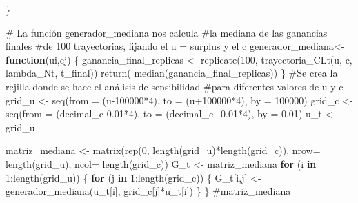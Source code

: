 \documentclass[
  us-letterpaper,
]{scrreprt}
\newenvironment{Shaded}{\begin{snugshade}}{\end{snugshade}}
\newcommand{\AttributeTok}[1]{\textcolor[rgb]{0.40,0.45,0.13}{#1}}
\newcommand{\CommentTok}[1]{\textcolor[rgb]{0.37,0.37,0.37}{#1}}
\newcommand{\ControlFlowTok}[1]{\textcolor[rgb]{0.00,0.23,0.31}{\textbf{#1}}}
\newcommand{\DecValTok}[1]{\textcolor[rgb]{0.68,0.00,0.00}{#1}}
\newcommand{\FloatTok}[1]{\textcolor[rgb]{0.68,0.00,0.00}{#1}}
\newcommand{\FunctionTok}[1]{\textcolor[rgb]{0.28,0.35,0.67}{#1}}
\newcommand{\NormalTok}[1]{\textcolor[rgb]{0.00,0.23,0.31}{#1}}
\newcommand{\OtherTok}[1]{\textcolor[rgb]{0.00,0.23,0.31}{#1}}
\newcommand{\SpecialCharTok}[1]{\textcolor[rgb]{0.37,0.37,0.37}{#1}}
\theoremstyle{plain}
\theoremstyle{plain}
\theoremstyle{definition}
\theoremstyle{remark}
\begin{document}
\begin{Shaded}
\begin{Highlighting}[]
\NormalTok{\}}

\CommentTok{\# La función generador\_mediana nos calcula }
\CommentTok{\#la mediana de las ganancias finales }
\CommentTok{\#de 100 trayectorias, fijando el u = surplus y el c}
\NormalTok{generador\_mediana}\OtherTok{\textless{}{-}} \ControlFlowTok{function}\NormalTok{(ui,cj)}
\NormalTok{  \{}
\NormalTok{  ganancia\_final\_replicas }\OtherTok{\textless{}{-}} \FunctionTok{replicate}\NormalTok{(}\DecValTok{100}\NormalTok{, }
                                       \FunctionTok{trayectoria\_CLt}\NormalTok{(u, c,}
\NormalTok{                                        lambda\_Nt, t\_final))}
  \FunctionTok{return}\NormalTok{( }\FunctionTok{median}\NormalTok{(ganancia\_final\_replicas))}
\NormalTok{  \}}
\CommentTok{\#Se crea la rejilla donde se hace el análisis de sensibilidad}
\CommentTok{\#para diferentes valores de u y c}
\NormalTok{grid\_u }\OtherTok{\textless{}{-}} \FunctionTok{seq}\NormalTok{(}\AttributeTok{from =}\NormalTok{ (u}\DecValTok{{-}100000}\SpecialCharTok{*}\DecValTok{4}\NormalTok{), }\AttributeTok{to =}\NormalTok{ (u}\SpecialCharTok{+}\DecValTok{100000}\SpecialCharTok{*}\DecValTok{4}\NormalTok{), }\AttributeTok{by =} \DecValTok{100000}\NormalTok{)}
\NormalTok{grid\_c }\OtherTok{\textless{}{-}} \FunctionTok{seq}\NormalTok{(}\AttributeTok{from =}\NormalTok{ (decimal\_c}\FloatTok{{-}0.01}\SpecialCharTok{*}\DecValTok{4}\NormalTok{), }\AttributeTok{to =}\NormalTok{ (decimal\_c}\FloatTok{+0.01}\SpecialCharTok{*}\DecValTok{4}\NormalTok{), }
              \AttributeTok{by =} \FloatTok{0.01}\NormalTok{)}
\NormalTok{u\_t }\OtherTok{\textless{}{-}}\NormalTok{ grid\_u}

\NormalTok{matriz\_mediana }\OtherTok{\textless{}{-}} \FunctionTok{matrix}\NormalTok{(}\FunctionTok{rep}\NormalTok{(}\DecValTok{0}\NormalTok{, }\FunctionTok{length}\NormalTok{(grid\_u)}\SpecialCharTok{*}\FunctionTok{length}\NormalTok{(grid\_c)),}
\AttributeTok{nrow=} \FunctionTok{length}\NormalTok{(grid\_u), }\AttributeTok{ncol=} \FunctionTok{length}\NormalTok{(grid\_c))}
\NormalTok{G\_t }\OtherTok{\textless{}{-}}\NormalTok{ matriz\_mediana}
\ControlFlowTok{for}\NormalTok{ (i }\ControlFlowTok{in} \DecValTok{1}\SpecialCharTok{:}\FunctionTok{length}\NormalTok{(grid\_u)) }
\NormalTok{  \{}
    \ControlFlowTok{for}\NormalTok{ (j }\ControlFlowTok{in} \DecValTok{1}\SpecialCharTok{:}\FunctionTok{length}\NormalTok{(grid\_c)) }
\NormalTok{      \{}
\NormalTok{        G\_t[i,j] }\OtherTok{\textless{}{-}} \FunctionTok{generador\_mediana}\NormalTok{(u\_t[i],}
\NormalTok{                              grid\_c[j]}\SpecialCharTok{*}\NormalTok{u\_t[i])}
\NormalTok{      \}}
\NormalTok{  \}  }
\CommentTok{\#matriz\_mediana}


\end{Highlighting}
\end{Shaded}
\end{document}
